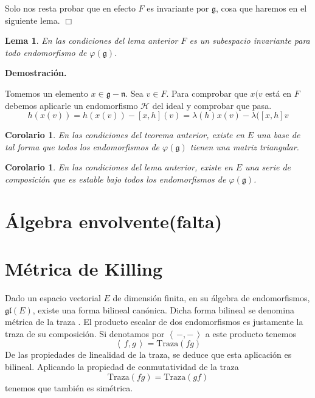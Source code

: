\documentclass[a4paper,draft,12pt]{article}
\newtheorem{lema}[teo]{Lema}%
\newtheorem{cor}[teo]{Corolario}%
\newcommand{\dem}{\noindent \textbf{Demostración. }\vspace{0.3 cm}}%
\newcommand{\g}{\mathfrak{g}}%
\newcommand{\h}{\mathcal{H}}%
\newcommand{\fin}{ $\Box $ \vspace{0.4 cm}}
\newcommand{\escalar}[2]{\left\langle\, #1,#2\, \right\rangle}  %
\newcommand{\df}[1]{\textsf{\color{blue}#1}}
\begin{document}
 Solo nos resta probar que en efecto $F$ es invariante por $\g$, cosa que haremos en el siguiente lema.  \fin
 
 \begin{lema}
 
En las condiciones del lema anterior $F$ es un subespacio invariante para todo endomorfismo de $\varphi (\g)$.

\end{lema}


\dem

Tomemos un elemento $x \in \g - \mathfrak{n}$.  Sea $v \in F$.  Para comprobar que $x(v$ está en $F$ debemos aplicarle un endomorfismo $\h$ del ideal y comprobar que pasa.
$$
h(x(v))= h(x(v))-[x,h](v)= \lambda(h)x(v)- \lambda([x,h]v
$$














\begin{cor}

En las condiciones del teorema anterior, existe en $E$ una base de tal forma que todos los endomorfismos  de $\varphi(\g)$ tienen una matriz triangular.

\end{cor}

\begin{cor}

En las condiciones del lema anterior, existe en $E$ una serie de composición que  es estable bajo todos los endomorfismos de $\varphi(\g)$.

\end{cor}











\newpage

\section{Álgebra envolvente(falta)}


\newpage

\section{Métrica de Killing}

Dado un espacio vectorial $E$ de dimensión finita, en  su álgebra de endomorfismos, $\mathfrak{gl}(E)$, existe una forma bilineal canónica.  Dicha forma bilineal se denomina  \df{métrica de la traza} .  El producto escalar de dos endomorfismos es justamente la traza de su composición.  Si denotamos por $\escalar{-}{-}$ a este producto tenemos
$$
\escalar{f}{g}= \mathrm{Traza}(fg)
$$
De las propiedades de linealidad de la traza, se deduce  que esta aplicación es bilineal.  Aplicando la propiedad de conmutatividad de la traza
$$
\mathrm{Traza}(fg) = \mathrm{Traza}(gf)
$$
tenemos que también es simétrica.
\end{document}
